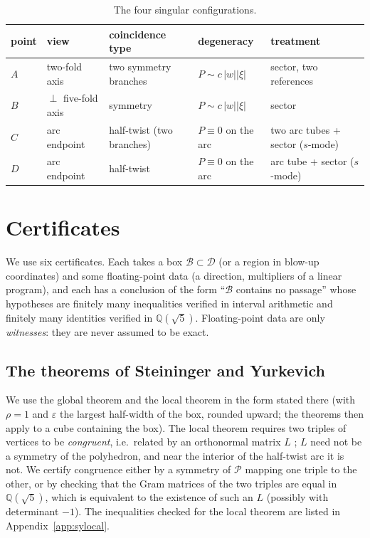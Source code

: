 \documentclass[11pt]{amsart}
\theoremstyle{definition}
\newcommand{\Q}{\mathbb{Q}}
\newcommand{\sq}{\sqrt5}
\newcommand{\abs}[1]{\lvert #1\rvert}
\newcommand{\RID}{\mathcal{P}}
\begin{document}
\begin{table}[h]
\centering\small
\begin{tabular}{@{}lllll@{}}
\toprule
point & view & coincidence type & degeneracy & treatment\\ \midrule
$A$ & two-fold axis & two symmetry branches & $P\sim c\,\abs{w}\abs{\xi}$ & sector, two references\\
$B$ & $\perp$ five-fold axis & symmetry & $P\sim c\,\abs{w}\abs{\xi}$ & sector\\
$C$ & arc endpoint & half-twist (two branches) & $P\equiv0$ on the arc & two arc tubes + sector ($s$-mode)\\
$D$ & arc endpoint & half-twist & $P\equiv0$ on the arc & arc tube + sector ($s$-mode)\\ \bottomrule
\end{tabular}
\caption{The four singular configurations.}\label{tab:sing}
\end{table}

\section{Certificates}\label{sec:cert}

We use six certificates. Each takes a box $\mathcal B\subset\mathcal D$ (or a region in blow-up coordinates) and some
floating-point data (a direction, multipliers of a linear program), and each has a conclusion of the form
``$\mathcal B$ contains no passage'' whose hypotheses are finitely many inequalities verified in interval arithmetic
and finitely many identities verified in $\Q(\sq)$. Floating-point data are only \emph{witnesses}: they are never
assumed to be exact.

\subsection{The theorems of Steininger and Yurkevich}
We use the global theorem \cite[Theorem 17]{SY25} and the local theorem \cite[Theorem 36]{SY25} in the form stated
there (with $\rho=1$ and $\varepsilon$ the largest half-width of the box, rounded upward; the theorems then apply to a cube
containing the box). The local theorem requires two triples of vertices to be
\emph{congruent}, i.e.\ related by an orthonormal matrix $L$ \cite[Definition 34]{SY25}; $L$ need not be a symmetry of
the polyhedron, and near the interior of the half-twist arc it is not. We certify congruence either by a symmetry
of $\RID$ mapping one triple to the other, or by checking that the Gram matrices of the two triples are equal in
$\Q(\sq)$, which is equivalent to the existence of such an $L$ (possibly with determinant $-1$). The inequalities
checked for the local theorem are listed in Appendix~\ref{app:sylocal}.
\end{document}
